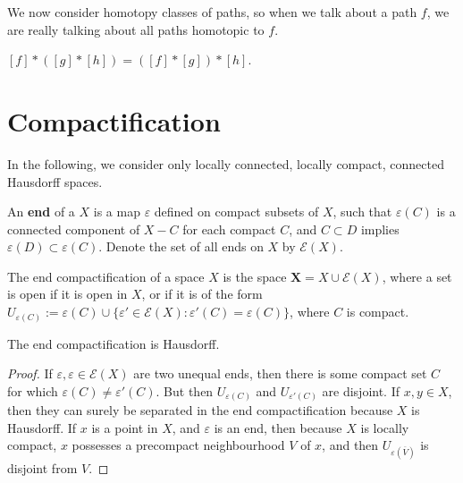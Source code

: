 We now consider homotopy classes of paths, so when we talk about a path $f$, we are really talking about all paths homotopic to $f$.

\begin{theorem}
    $[f] * ([g] * [h]) = ([f] * [g]) * [h]$.
\end{theorem}

\chapter{Compactification}

In the following, we consider only locally connected, locally compact, connected Hausdorff spaces.

\begin{definition}
    An {\bf end} of a $X$ is a map $\varepsilon$ defined on compact subsets of $X$, such that $\varepsilon(C)$ is a connected component of $X - C$ for each compact $C$, and $C \subset D$ implies $\varepsilon(D) \subset \varepsilon(C)$. Denote the set of all ends on $X$ by $\mathcal{E}(X)$.
\end{definition}

\begin{definition}
    The end compactification of a space $X$ is the space $\mathbf{X} = X \cup \mathcal{E}(X)$, where a set is open if it is open in $X$, or if it is of the form $U_{\varepsilon(C)} := \varepsilon(C) \cup \{ \varepsilon' \in \mathcal{E}(X) : \varepsilon'(C) = \varepsilon(C) \}$, where $C$ is compact.
\end{definition}

\begin{lemma}
    The end compactification is Hausdorff.
\end{lemma}
\begin{proof}
    If $\varepsilon, \varepsilon \in \mathcal{E}(X)$ are two unequal ends, then there is some compact set $C$ for which $\varepsilon(C) \neq \varepsilon'(C)$. But then $U_{\varepsilon(C)}$ and $U_{\varepsilon'(C)}$ are disjoint. If $x, y \in X$, then they can surely be separated in the end compactification because $X$ is Hausdorff. If $x$ is a point in $X$, and $\varepsilon$ is an end, then because $X$ is locally compact, $x$ possesses a precompact neighbourhood $V$ of $x$, and then $U_{\varepsilon(\overline{V})}$ is disjoint from $V$.
\end{proof}

